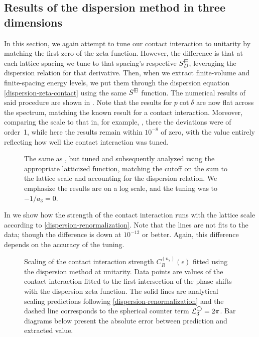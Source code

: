 
\subsection{Results of the dispersion method in three dimensions}

In this section, we again attempt to tune our contact interaction to unitarity by matching the first zero of the zeta function.
However, the difference is that at each lattice spacing we tune to that spacing's respective $S^{\boxplus}_D$, leveraging the dispersion relation for that derivative.
Then, when we extract finite-volume and finite-spacing energy levels, we put them through the dispersion equation \eqref{dispersion-zeta-contact} using the same $S^{\boxplus}$ function.
The numerical results of said procedure are shown in .
Note that the results for $p\cot\delta$ are now flat across the spectrum, matching the known result for a contact interaction.
Moreover, comparing the scale to that in, for example, , there the deviations were of order~1, while here the results remain within $10^{-8}$ of zero, with the value entirely reflecting how well the contact interaction was tuned.

\begin{figure}[htb]
    \scalebox{0.9}{}
    \caption{The same as , but tuned and subsequently analyzed using the appropriate latticized \Luscher function, matching the cutoff on the sum to the lattice scale and accounting for the dispersion relation.
    We emphasize the results are on a log scale, and the tuning was to $-1/a_3 = 0$.
    }
    \label{fig:unimproved dispersion}
\end{figure}

In  we show how the strength of the contact interaction runs with the lattice scale according to \eqref{dispersion-renormalization}.
Note that the lines are not fits to the data; though the difference is down at $10^{-12}$ or better.
Again, this difference depends on the accuracy of the tuning.

\begin{figure}[htb]
    \scalebox{0.8}{}
    \caption{
        Scaling of the contact interaction strength $C_R^{(n_s)}(\epsilon)$ fitted using the dispersion method at unitarity.
        Data points are values of the contact interaction fitted to the first intersection of the phase shifts with the dispersion zeta function.
        The solid lines are analytical scaling predictions following \eqref{dispersion-renormalization} and the dashed line corresponds to the spherical counter term $ \mathcal{L}^{\bigcirc}_3 = 2 \pi$.
        Bar diagrams below present the absolute error between prediction and extracted value.
    }
    \label{fig:dispersion running of strength}
\end{figure}

